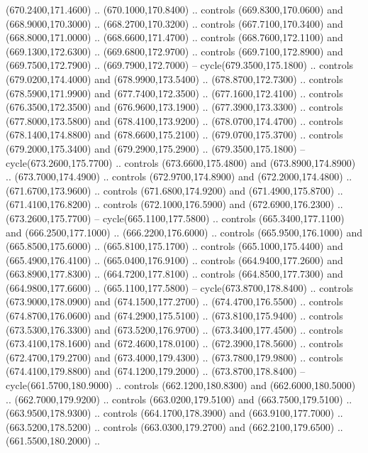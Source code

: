 {\begin{scope}[y=0.80pt, x=0.80pt, yscale=-1, xscale=1, inner sep=0pt, outer sep=0pt, #1]
      (670.2400,171.4600) .. (670.1000,170.8400) .. controls (669.8300,170.0600) and
      (668.9000,170.3000) .. (668.2700,170.3200) .. controls (667.7100,170.3400) and
      (668.8000,171.0000) .. (668.6600,171.4700) .. controls (668.7600,172.1100) and
      (669.1300,172.6300) .. (669.6800,172.9700) .. controls (669.7100,172.8900) and
      (669.7500,172.7900) .. (669.7900,172.7000) -- cycle(679.3500,175.1800) ..
      controls (679.0200,174.4000) and (678.9900,173.5400) .. (678.8700,172.7300) ..
      controls (678.5900,171.9900) and (677.7400,172.3500) .. (677.1600,172.4100) ..
      controls (676.3500,172.3500) and (676.9600,173.1900) .. (677.3900,173.3300) ..
      controls (677.8000,173.5800) and (678.4100,173.9200) .. (678.0700,174.4700) ..
      controls (678.1400,174.8800) and (678.6600,175.2100) .. (679.0700,175.3700) ..
      controls (679.2000,175.3400) and (679.2900,175.2900) .. (679.3500,175.1800) --
      cycle(673.2600,175.7700) .. controls (673.6600,175.4800) and
      (673.8900,174.8900) .. (673.7000,174.4900) .. controls (672.9700,174.8900) and
      (672.2000,174.4800) .. (671.6700,173.9600) .. controls (671.6800,174.9200) and
      (671.4900,175.8700) .. (671.4100,176.8200) .. controls (672.1000,176.5900) and
      (672.6900,176.2300) .. (673.2600,175.7700) -- cycle(665.1100,177.5800) ..
      controls (665.3400,177.1100) and (666.2500,177.1000) .. (666.2200,176.6000) ..
      controls (665.9500,176.1000) and (665.8500,175.6000) .. (665.8100,175.1700) ..
      controls (665.1000,175.4400) and (665.4900,176.4100) .. (665.0400,176.9100) ..
      controls (664.9400,177.2600) and (663.8900,177.8300) .. (664.7200,177.8100) ..
      controls (664.8500,177.7300) and (664.9800,177.6600) .. (665.1100,177.5800) --
      cycle(673.8700,178.8400) .. controls (673.9000,178.0900) and
      (674.1500,177.2700) .. (674.4700,176.5500) .. controls (674.8700,176.0600) and
      (674.2900,175.5100) .. (673.8100,175.9400) .. controls (673.5300,176.3300) and
      (673.5200,176.9700) .. (673.3400,177.4500) .. controls (673.4100,178.1600) and
      (672.4600,178.0100) .. (672.3900,178.5600) .. controls (672.4700,179.2700) and
      (673.4000,179.4300) .. (673.7800,179.9800) .. controls (674.4100,179.8800) and
      (674.1200,179.2000) .. (673.8700,178.8400) -- cycle(661.5700,180.9000) ..
      controls (662.1200,180.8300) and (662.6000,180.5000) .. (662.7000,179.9200) ..
      controls (663.0200,179.5100) and (663.7500,179.5100) .. (663.9500,178.9300) ..
      controls (664.1700,178.3900) and (663.9100,177.7000) .. (663.5200,178.5200) ..
      controls (663.0300,179.2700) and (662.2100,179.6500) .. (661.5500,180.2000) ..

\end{scope}}
